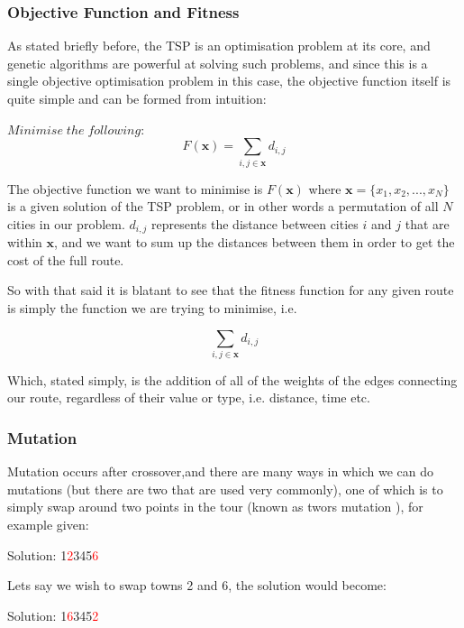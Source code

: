 \documentclass[11pt,a4paper,titlepage]{article}
\begin{document}
\subsubsection{Objective Function and Fitness}

As stated briefly before, the TSP is an optimisation problem at its core, and genetic algorithms are powerful at solving such problems, and since this is a single objective optimisation problem in this case, the objective function itself is quite simple and can be formed from intuition:

$Minimise\; the\; following:$ \[F(\mathbf{x}) = \sum_{i,j \in \mathbf{x}} d_{i,j} \]

The objective function we want to minimise is $F(\mathbf{x})$ where $\mathbf{x} = \{x_1, x_2, ..., x_N\}$ is a given solution of the TSP problem, or in other words a permutation of all $N$ cities in our problem. $d_{i,j}$ represents the distance between cities $i$ and $j$ that are within $\mathbf{x}$, and we want to sum up the distances between them in order to get the cost of the full route.

So with that said it is blatant to see that the fitness function for any given route is simply the function we are trying to minimise, i.e.

\[\sum_{i,j \in \mathbf{x}} d_{i,j}\]

Which, stated simply, is the addition of all of the weights of the edges connecting our route, regardless of their value or type, i.e. distance, time etc.

\subsubsection{Mutation}

Mutation occurs after crossover,and there are many ways in which we can do mutations (but there are two that are used very commonly), one of which is to simply swap around two points in the tour (known as twors mutation \cite{GAMutations}), for example given:

\begin{center}\Large
Solution: 1\textcolor{red}{2}345\textcolor{red}{6}
\end{center}

Lets say we wish to swap towns 2 and 6, the solution would become:

\begin{center}\Large
Solution: 1\textcolor{red}{6}345\textcolor{red}{2}
\end{center}
\end{document}
